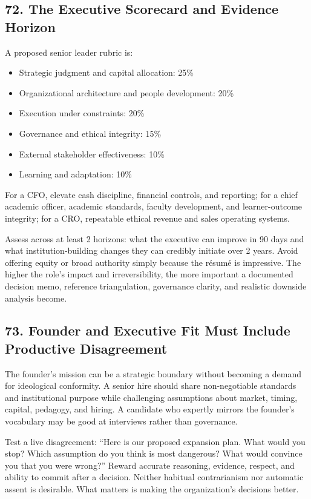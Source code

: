 \subsection*{72. The Executive Scorecard and Evidence Horizon}

A proposed senior leader rubric is:
\begin{itemize}[leftmargin=*]
\item Strategic judgment and capital allocation: 25\%
\item Organizational architecture and people development: 20\%
\item Execution under constraints: 20\%
\item Governance and ethical integrity: 15\%
\item External stakeholder effectiveness: 10\%
\item Learning and adaptation: 10\%
\end{itemize}
For a CFO, elevate cash discipline, financial controls, and reporting; for a chief academic officer, academic standards, faculty development, and learner-outcome integrity; for a CRO, repeatable ethical revenue and sales operating systems.

Assess across at least 2 horizons: what the executive can improve in 90 days and what institution-building changes they can credibly initiate over 2 years. Avoid offering equity or broad authority simply because the résumé is impressive. The higher the role's impact and irreversibility, the more important a documented decision memo, reference triangulation, governance clarity, and realistic downside analysis become.

\subsection*{73. Founder and Executive Fit Must Include Productive Disagreement}

The founder's mission can be a strategic boundary without becoming a demand for ideological conformity. A senior hire should share non-negotiable standards and institutional purpose while challenging assumptions about market, timing, capital, pedagogy, and hiring. A candidate who expertly mirrors the founder's vocabulary may be good at interviews rather than governance.

Test a live disagreement: ``Here is our proposed expansion plan. What would you stop? Which assumption do you think is most dangerous? What would convince you that you were wrong?'' Reward accurate reasoning, evidence, respect, and ability to commit after a decision. Neither habitual contrarianism nor automatic assent is desirable. What matters is making the organization's decisions better.
